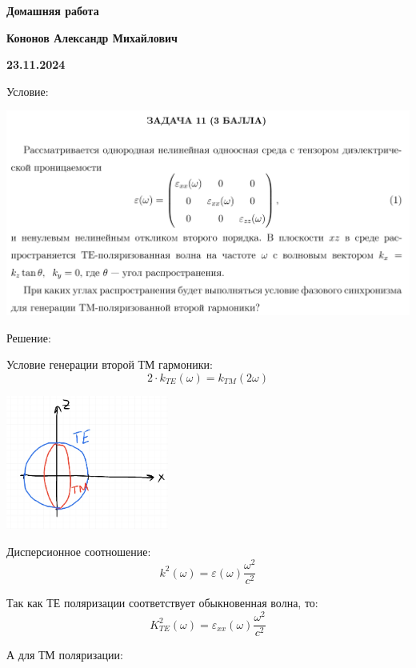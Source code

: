 \documentclass[12pt]{article}
\begin{document}
\begin{large}
\begin{center}
\LARGE \textbf{Домашняя работа}
\par
\LARGE \textbf{Кононов Александр Михайлович}
\par
    \textbf{23.11.2024}
\end{center}
\par Условие:
\par
\includegraphics[width=1\textwidth]{photo.png}
\par Решение:
\par
\par Условие генерации второй ТМ гармоники:
\[
    2 \cdot k_{TE}( \omega ) = k_{TM}(2 \omega )
\]
\par
\begin{center}
\includegraphics[width=0.4\textwidth]{photo_2.jpg}
\end{center}
\par Дисперсионное соотношение:
\[
    k^2( \omega ) = \varepsilon ( \omega ) \frac{ \omega^2 }{c^2}
\]
\par Так как ТЕ поляризации соответствует обыкновенная волна, то:
\[
    K_{TE}^2 ( \omega ) = \varepsilon_{xx} ( \omega ) \frac{ \omega^2 }{c^2}
\]
\par А для ТМ поляризации:

\end{large}
\end{document}

